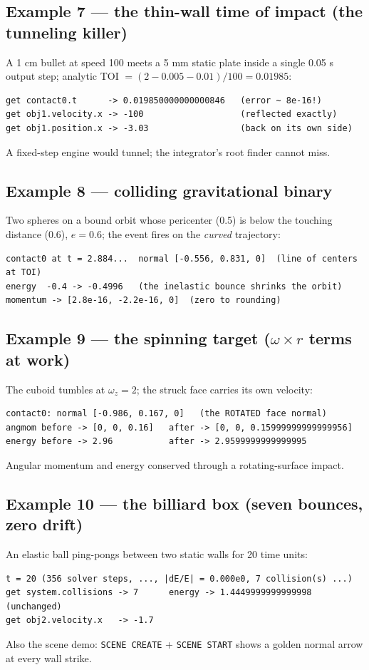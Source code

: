 \documentclass[11pt]{article}
\newcommand{\kw}[1]{\texttt{\uppercase{#1}}}
\begin{document}
\subsection{Example 7 --- the thin-wall time of impact (the tunneling killer)}
A 1 cm bullet at speed 100 meets a 5 mm static plate inside a single 0.05 s
output step; analytic TOI $= (2 - 0.005 - 0.01)/100 = 0.01985$:
\begin{lstlisting}
get contact0.t      -> 0.019850000000000846   (error ~ 8e-16!)
get obj1.velocity.x -> -100                   (reflected exactly)
get obj1.position.x -> -3.03                  (back on its own side)
\end{lstlisting}
A fixed-step engine would tunnel; the integrator's root finder cannot miss.

\subsection{Example 8 --- colliding gravitational binary}
Two spheres on a bound orbit whose pericenter (0.5) is below the touching
distance (0.6), $e = 0.6$; the event fires on the \emph{curved} trajectory:
\begin{lstlisting}
contact0 at t = 2.884...  normal [-0.556, 0.831, 0]  (line of centers at TOI)
energy  -0.4 -> -0.4996   (the inelastic bounce shrinks the orbit)
momentum -> [2.8e-16, -2.2e-16, 0]  (zero to rounding)
\end{lstlisting}

\subsection{Example 9 --- the spinning target ($\omega \times r$ terms at work)}
The cuboid tumbles at $\omega_z = 2$; the struck face carries its own velocity:
\begin{lstlisting}
contact0: normal [-0.986, 0.167, 0]   (the ROTATED face normal)
angmom before -> [0, 0, 0.16]   after -> [0, 0, 0.15999999999999956]
energy before -> 2.96           after -> 2.9599999999999995
\end{lstlisting}
Angular momentum and energy conserved through a rotating-surface impact.

\subsection{Example 10 --- the billiard box (seven bounces, zero drift)}
An elastic ball ping-pongs between two static walls for 20 time units:
\begin{lstlisting}
t = 20 (356 solver steps, ..., |dE/E| = 0.000e0, 7 collision(s) ...)
get system.collisions -> 7      energy -> 1.4449999999999998 (unchanged)
get obj2.velocity.x   -> -1.7
\end{lstlisting}
Also the scene demo: \kw{scene create} + \kw{scene start} shows a golden
normal arrow at every wall strike.
\end{document}
